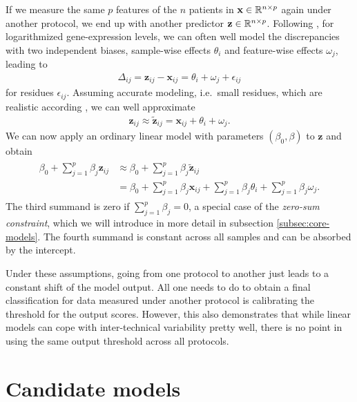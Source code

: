 If we 
measure the same $p$ features of the $n$ patients in $\mathbf{x} \in \mathbb{R}^{n \times p}$ again under 
another protocol, we end up with another predictor 
$\mathbf{z} \in \mathbb{R}^{n \times p}$.
Following \cite{transplatform17}, for logarithmized gene-expression levels,
we can often well model the discrepancies with two independent biases, sample-wise effects $\theta_i$
and feature-wise effects $\omega_j$, leading to
\begin{align}\label{eq:inter-tech-exact}
    \Delta_{ij} = \mathbf{z}_{ij} - \mathbf{x}_{ij} = \theta_i + \omega_j + \epsilon_{ij}
\end{align}
for residues $\epsilon_{ij}$. Assuming accurate modeling, i.e.\ small residues, which are realistic 
according \cite{transplatform17}, we can well approximate
\begin{align}
    \mathbf{z}_{ij} \approx \tilde{\mathbf{z}}_{ij} = \mathbf{x}_{ij} + \theta_i + \omega_j.
\end{align}
We can now apply an ordinary linear model with parameters $(\beta_0, \beta)$ to $\mathbf{z}$ 
and obtain
\begin{align} \label{eq:inter-tech}
\begin{split}
    \beta_0 + \sum_{j=1}^p \beta_j \mathbf{z}_{ij} &\approx \beta_0 + \sum_{j=1}^p \beta_j \tilde{\mathbf{z}}_{ij} \\
    &= \beta_0 + \sum_{j=1}^p \beta_j \mathbf{x}_{ij} + \sum_{j=1}^p \beta_j \theta_i + \sum_{j=1}^p \beta_j \omega_j.
\end{split}
\end{align}
The third summand is zero if $\sum_{j = 1}^p \beta_j = 0$, a special case of the \textit{zero-sum 
constraint}, which we will introduce in more detail in subsection \ref{subsec:core-models}. 
The fourth summand is constant across all samples and can be absorbed by the intercept. 

Under these assumptions,
going from one protocol to another just leads to a constant shift of the model 
output. All one needs to do to obtain a final classification for data measured under another 
protocol is calibrating the threshold for the output scores. However, this 
also demonstrates that while linear models can cope with inter-technical variability 
pretty well, there is no point in using the same output threshold across all protocols.

\section{Candidate models}\label{sec:candidate-models}

